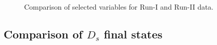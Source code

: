 \begin{figure}[h]

\caption{Comparison of selected variables for Run-I and Run-II data.}
\label{fig:}
\end{figure}

%
%
%
%
%



\subsection{Comparison of $D_s$ final states}

